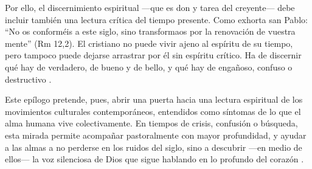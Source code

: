 \documentclass[a4paper,12pt]{article}
\begin{document}
Por ello, el discernimiento espiritual —que es don y tarea del creyente— debe incluir también una lectura crítica del tiempo presente. Como exhorta san Pablo: “No os conforméis a este siglo, sino transformaos por la renovación de vuestra mente” \cite{bibid}(Rm 12,2). El cristiano no puede vivir ajeno al espíritu de su tiempo, pero tampoco puede dejarse arrastrar por él sin espíritu crítico. Ha de discernir qué hay de verdadero, de bueno y de bello, y qué hay de engañoso, confuso o destructivo \cite{jung1959}.

Este epílogo pretende, pues, abrir una puerta hacia una lectura espiritual de los movimientos culturales contemporáneos, entendidos como síntomas de lo que el alma humana vive colectivamente. En tiempos de crisis, confusión o búsqueda, esta mirada permite acompañar pastoralmente con mayor profundidad, y ayudar a las almas a no perderse en los ruidos del siglo, sino a descubrir —en medio de ellos— la voz silenciosa de Dios que sigue hablando en lo profundo del corazón \cite{jung1959}.

	\clearpage
	
\printbibliography

	
\end{document}
